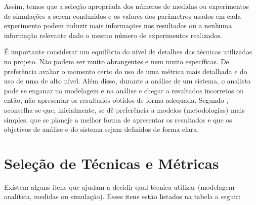     Assim, temos que a seleção apropriada dos números de medidas ou experimentos de simulações a serem conduzidos e os valores dos parâmetros usados em cada experimento podem induzir mais informações nos resultados ou a nenhuma informação relevante dado o mesmo número de experimentos realizados.
    
    É importante considerar um equilíbrio do nível de detalhes das técnicas utilizadas no projeto. Não podem ser muito abrangentes e nem muito específicas. De preferência avaliar o momento certo do uso de uma métrica mais detalhada e do uso de uma de alto nível. Além disso, durante a análise de um sistema, o analista pode se enganar na modelagem e na análise e chegar a resultados incorretos ou então, não apresentar os resultados obtidos de forma adequada. Segundo , aconselha-se que, inicialmente, se dê preferência a modelos (metodologias) mais simples, que se planeje a melhor forma de apresentar os resultados e que os objetivos de análise e do sistema sejam definidos de forma clara.
    
\section{Seleção de Técnicas e Métricas}
    
    Existem alguns itens que ajudam a decidir qual técnica utilizar (modelagem analítica, medidas ou simulação). Esses itens estão listados na tabela a seguir:
  
  
  
  
  
  
  
